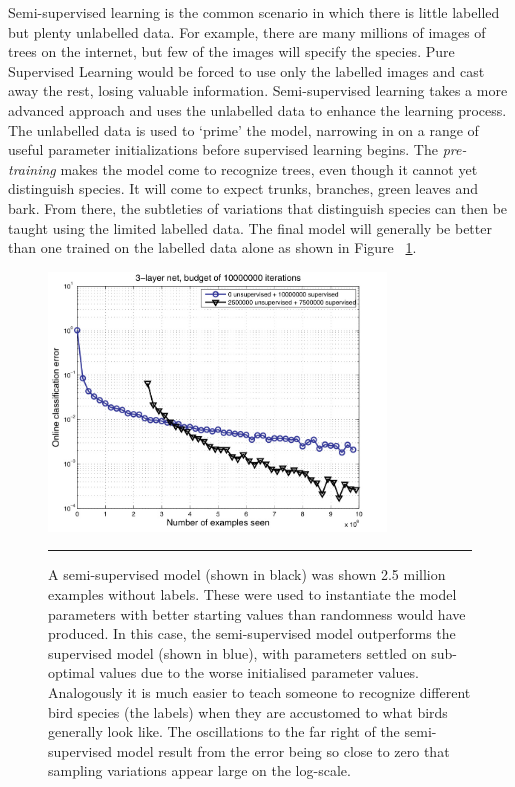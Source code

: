 Semi-supervised learning is the common scenario in which there is little labelled but plenty unlabelled data.
For example, there are many millions of images of trees on the internet, but few of the images will specify the species.
Pure Supervised Learning would be forced to use only the labelled images and cast away the rest, losing valuable information.
Semi-supervised learning takes a more advanced approach and uses the unlabelled data to enhance the learning process.
The unlabelled data is used to `prime' the model, narrowing in on a range of useful parameter initializations before supervised learning begins.
The \textit{pre-training} makes the model come to recognize trees, even though it cannot yet distinguish species.
It will come to expect trunks, branches, green leaves and bark.
From there, the subtleties of variations that distinguish species can then be taught using the limited labelled data.
The final model will generally be better than one trained on the labelled data alone as shown in Figure ~\ref{fig:Unsupervised_learning}.
\begin{figure}[htbp]
	\centering
		\includegraphics[width = 0.8\textwidth]{./Figures/Learning_deep_architectures_for_AI_Bengio_unsupervised_learning.jpg}
		\rule{35em}{0.5pt}
	\caption[Semi-supervised Learning]{A semi-supervised model (shown in black) was shown 2.5 million examples without labels. These were used to instantiate the model parameters with better starting values than randomness would have produced. In this case, the semi-supervised model outperforms the supervised model (shown in blue), with parameters settled on sub-optimal values due to the worse initialised parameter values. Analogously it is much easier to teach someone to recognize different bird species (the labels) when they are accustomed to what birds generally look like. The oscillations to the far right of the semi-supervised model result from the error being so close to zero that sampling variations appear large on the log-scale.}
	\label{fig:Unsupervised_learning}
\end{figure}

